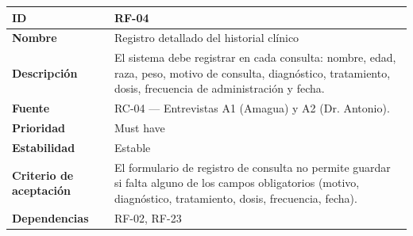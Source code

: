 {\def\LTcaptype{none} %
\begin{longtable}[]{@{}
  >{\raggedright\arraybackslash}p{}
  >{\raggedright\arraybackslash}p{}@{}}
\toprule\noalign{}
\begin{minipage}[b]{\linewidth}\raggedright
\textbf{ID}
\end{minipage} & \begin{minipage}[b]{\linewidth}\raggedright
RF-04
\end{minipage} \\
\midrule\noalign{}
\endhead
\bottomrule\noalign{}
\endlastfoot
\textbf{Nombre} & \begin{minipage}[t]{\linewidth}\raggedright
Registro detallado del historial clínico
\end{minipage} \\
\textbf{Descripción} & \begin{minipage}[t]{\linewidth}\raggedright
El sistema debe registrar en cada consulta: nombre, edad, raza, peso,
motivo de consulta, diagnóstico, tratamiento, dosis, frecuencia de
administración y fecha.
\end{minipage} \\
\textbf{Fuente} & \begin{minipage}[t]{\linewidth}\raggedright
RC-04 --- Entrevistas A1 (Amagua) y A2 (Dr. Antonio).
\end{minipage} \\
\textbf{Prioridad} & \begin{minipage}[t]{\linewidth}\raggedright
Must have
\end{minipage} \\
\textbf{Estabilidad} & \begin{minipage}[t]{\linewidth}\raggedright
Estable
\end{minipage} \\
\textbf{Criterio de aceptación} &
\begin{minipage}[t]{\linewidth}\raggedright
El formulario de registro de consulta no permite guardar si falta alguno
de los campos obligatorios (motivo, diagnóstico, tratamiento, dosis,
frecuencia, fecha).
\end{minipage} \\
\textbf{Dependencias} & \begin{minipage}[t]{\linewidth}\raggedright
RF-02, RF-23
\end{minipage} \\
\end{longtable}
}

